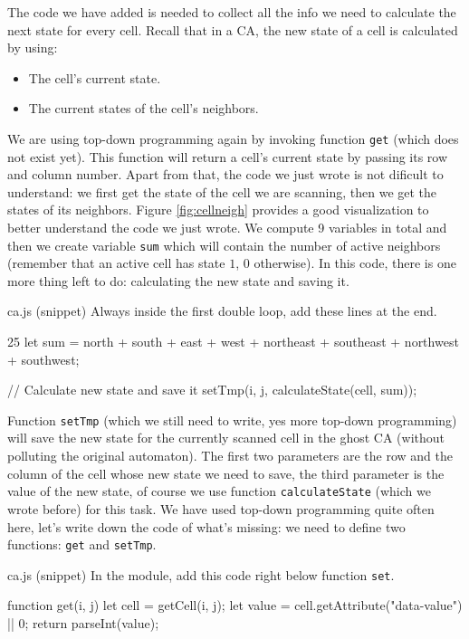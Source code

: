 The code we have added is needed to collect all the info we need to calculate the next state for every cell.
Recall that in a CA, the new state of a cell is calculated by using:

\begin{itemize}
\item The cell's current state.
\item The current states of the cell's neighbors.
\end{itemize}

We are using top-down programming again by invoking function \texttt{get} (which does not exist yet). This function
will return a cell's current state by passing its row and column number. Apart from that, the code we
just wrote is not dificult to understand: we first get the state of the cell we are scanning, then we get the states
of its neighbors. Figure \ref{fig:cellneigh} provides a good visualization to better understand the code we just
wrote.
We compute 9 variables in total and then we create variable \texttt{sum} which will
contain the number of active neighbors (remember that an active cell has state $1$, $0$ otherwise). In this
code, there is one more thing left to do: calculating the new state and saving it.

\begin{programcode}{ca.js (snippet)}
Always inside the first double loop, add these lines at the end.
\begin{codeh1}{2}{5}
let sum = north + south + east + west + northeast + southeast + northwest + southwest;

// Calculate new state and save it
setTmp(i, j, calculateState(cell, sum));
\end{codeh1}
\end{programcode}

Function \texttt{setTmp} (which we still need to write, yes more top-down programming) will save the new state
for the currently scanned cell in the ghost CA (without polluting the original automaton).
The first two parameters are the row and the column of the cell whose
new state we need to save, the third parameter is the value of the new state, of course we use function
\texttt{calculateState} (which we wrote before) for this task. We have used top-down programming quite often here,
let's write down the code of what's missing: we need to define two functions: \texttt{get} and \texttt{setTmp}.

\begin{programcode}{ca.js (snippet)}
In the module, add this code right below function \texttt{set}.
\begin{code}
function get(i, j) {
  let cell = getCell(i, j);
  let value = cell.getAttribute("data-value") || 0;
  return parseInt(value);
}
\end{code}
\end{programcode}

